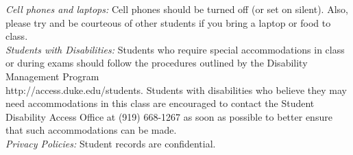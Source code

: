 \documentclass[11pt]{article}
\begin{document}
\emph{Cell phones and laptops:} Cell phones should be turned off (or set on silent). Also, please try and be courteous of other students if you bring a laptop or food to class. \\


\emph{Students with Disabilities:} Students who require special accommodations in class or during exams should follow the procedures outlined by the Disability Management Program \\ http://access.duke.edu/students. Students with disabilities who believe they may need accommodations in this class are encouraged to contact the Student Disability Access Office at (919) 668-1267 as soon as possible to better ensure that such accommodations can be made. \\

\emph{Privacy Policies:} 
Student records are confidential.
\end{document}
